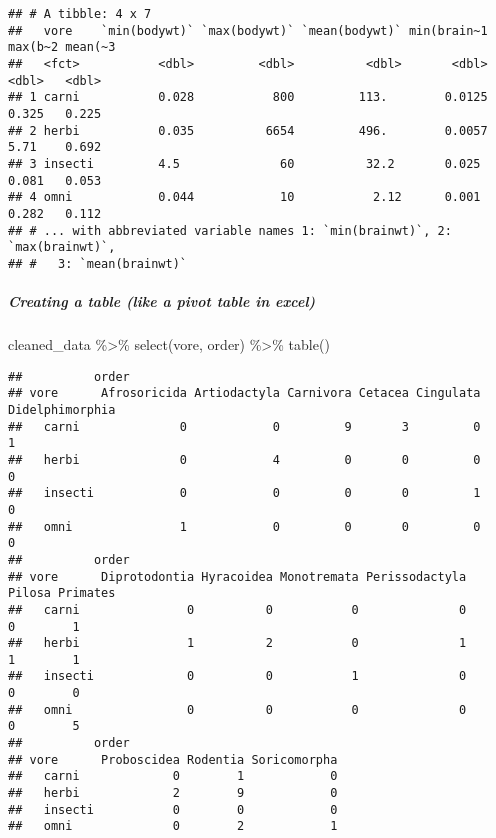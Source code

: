 \documentclass[
]{article}
\newenvironment{Shaded}{\begin{snugshade}}{\end{snugshade}}
\newcommand{\FunctionTok}[1]{\textcolor[rgb]{0.00,0.00,0.00}{#1}}
\newcommand{\NormalTok}[1]{#1}
\newcommand{\SpecialCharTok}[1]{\textcolor[rgb]{0.00,0.00,0.00}{#1}}
\begin{document}
\begin{verbatim}
## # A tibble: 4 x 7
##   vore    `min(bodywt)` `max(bodywt)` `mean(bodywt)` min(brain~1 max(b~2 mean(~3
##   <fct>           <dbl>         <dbl>          <dbl>       <dbl>   <dbl>   <dbl>
## 1 carni           0.028           800         113.        0.0125   0.325   0.225
## 2 herbi           0.035          6654         496.        0.0057   5.71    0.692
## 3 insecti         4.5              60          32.2       0.025    0.081   0.053
## 4 omni            0.044            10           2.12      0.001    0.282   0.112
## # ... with abbreviated variable names 1: `min(brainwt)`, 2: `max(brainwt)`,
## #   3: `mean(brainwt)`
\end{verbatim}

\hypertarget{creating-a-table-like-a-pivot-table-in-excel}{%
\subparagraph{Creating a table (like a pivot table in
excel)}\label{creating-a-table-like-a-pivot-table-in-excel}}

\begin{Shaded}
\begin{Highlighting}[]
\NormalTok{cleaned\_data }\SpecialCharTok{\%\textgreater{}\%} 
  \FunctionTok{select}\NormalTok{(vore, order) }\SpecialCharTok{\%\textgreater{}\%} 
  \FunctionTok{table}\NormalTok{()}
\end{Highlighting}
\end{Shaded}

\begin{verbatim}
##          order
## vore      Afrosoricida Artiodactyla Carnivora Cetacea Cingulata Didelphimorphia
##   carni              0            0         9       3         0               1
##   herbi              0            4         0       0         0               0
##   insecti            0            0         0       0         1               0
##   omni               1            0         0       0         0               0
##          order
## vore      Diprotodontia Hyracoidea Monotremata Perissodactyla Pilosa Primates
##   carni               0          0           0              0      0        1
##   herbi               1          2           0              1      1        1
##   insecti             0          0           1              0      0        0
##   omni                0          0           0              0      0        5
##          order
## vore      Proboscidea Rodentia Soricomorpha
##   carni             0        1            0
##   herbi             2        9            0
##   insecti           0        0            0
##   omni              0        2            1
\end{verbatim}
\end{document}
